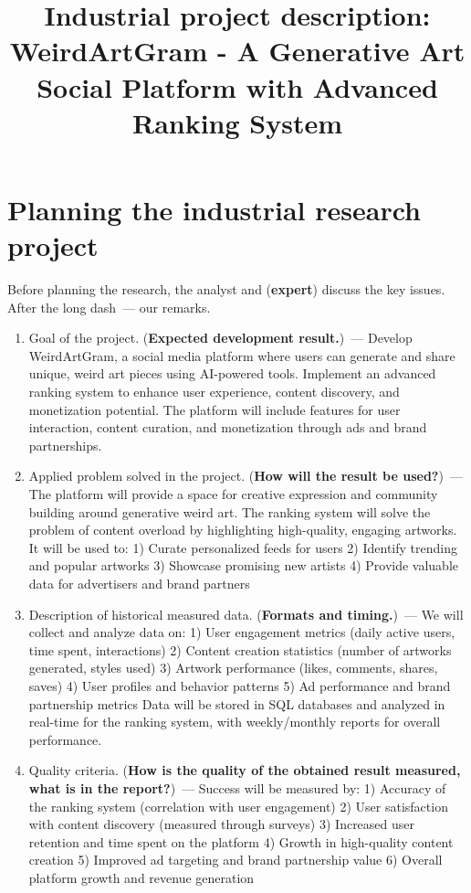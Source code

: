 \documentclass[12pt]{article}
\title{Industrial project description: WeirdArtGram - A Generative Art Social Platform with Advanced Ranking System}
\date{}
\begin{document}
\maketitle

\section{Planning the industrial research project}
Before planning the research, the analyst and (\textbf{expert}) discuss the key issues. After the long dash~--- our remarks.

\begin{enumerate}
\item Goal of the project. (\textbf{Expected development result.})~---
Develop WeirdArtGram, a social media platform where users can generate and share unique, weird art pieces using AI-powered tools. Implement an advanced ranking system to enhance user experience, content discovery, and monetization potential. The platform will include features for user interaction, content curation, and monetization through ads and brand partnerships.

\item Applied problem solved in the project. (\textbf{How will the result be used?})~--- 
The platform will provide a space for creative expression and community building around generative weird art. The ranking system will solve the problem of content overload by highlighting high-quality, engaging artworks. It will be used to:
1) Curate personalized feeds for users
2) Identify trending and popular artworks
3) Showcase promising new artists
4) Provide valuable data for advertisers and brand partners

\item Description of historical measured data. (\textbf{Formats and timing.})~--- 
We will collect and analyze data on:
1) User engagement metrics (daily active users, time spent, interactions)
2) Content creation statistics (number of artworks generated, styles used)
3) Artwork performance (likes, comments, shares, saves)
4) User profiles and behavior patterns
5) Ad performance and brand partnership metrics
Data will be stored in SQL databases and analyzed in real-time for the ranking system, with weekly/monthly reports for overall performance.

\item Quality criteria. (\textbf{How is the quality of the obtained result measured, what is in the report?})~--- 
Success will be measured by:
1) Accuracy of the ranking system (correlation with user engagement)
2) User satisfaction with content discovery (measured through surveys)
3) Increased user retention and time spent on the platform
4) Growth in high-quality content creation
5) Improved ad targeting and brand partnership value
6) Overall platform growth and revenue generation


\end{enumerate}
\end{document}
